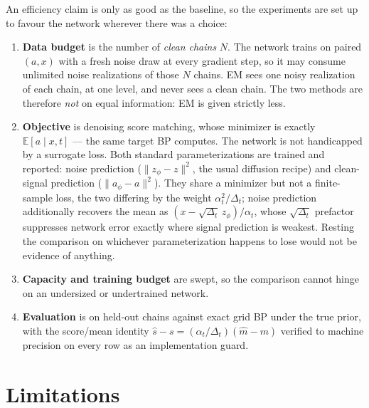\documentclass[11pt]{article}
\theoremstyle{remark}
\newcommand{\E}{\mathbb{E}}
\begin{document}
An efficiency claim is only as good as the baseline, so the experiments are set
up to favour the network wherever there was a choice:
\begin{enumerate}[leftmargin=*]
\item \textbf{Data budget} is the number of \emph{clean chains} $N$. The network
  trains on paired $(a,x)$ with a fresh noise draw at every gradient step, so it
  may consume unlimited noise realizations of those $N$ chains. EM sees one
  noisy realization of each chain, at one level, and never sees a clean chain.
  The two methods are therefore \emph{not} on equal information: EM is given
  strictly less.
\item \textbf{Objective} is denoising score matching, whose minimizer is exactly
  $\E[a\mid x,t]$ --- the same target BP computes. The network is not
  handicapped by a surrogate loss. Both standard parameterizations are trained
  and reported: noise prediction ($\|z_\phi - z\|^2$, the usual diffusion
  recipe) and clean-signal prediction ($\|a_\phi - a\|^2$). They share a
  minimizer but not a finite-sample loss, the two differing by the weight
  $\alpha_t^2/\Delta_t$; noise prediction additionally recovers the mean as
  $(x - \sqrt{\Delta_t}\, z_\phi)/\alpha_t$, whose $\sqrt{\Delta_t}$ prefactor
  suppresses network error exactly where signal prediction is weakest. Resting
  the comparison on whichever parameterization happens to lose would not be
  evidence of anything.
\item \textbf{Capacity and training budget} are swept, so the comparison cannot
  hinge on an undersized or undertrained network.
\item \textbf{Evaluation} is on held-out chains against exact grid BP under the
  true prior, with the score/mean identity
  $\hat s - s = (\alpha_t/\Delta_t)(\hat m - m)$ verified to machine precision
  on every row as an implementation guard.
\end{enumerate}

\section{Limitations}
\label{sec:limits}
\end{document}
